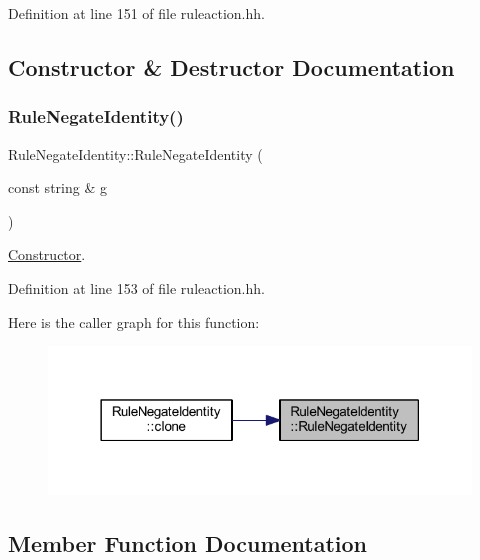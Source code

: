 Definition at line 151 of file ruleaction.\+hh.



\subsection{Constructor \& Destructor Documentation}
\mbox{\label{class_rule_negate_identity_a7c81a211d10e7c153f438dcff9f5b8f8}} 
\subsubsection{\texorpdfstring{RuleNegateIdentity()}{RuleNegateIdentity()}}
{\footnotesize\ttfamily Rule\+Negate\+Identity\+::\+Rule\+Negate\+Identity (\begin{DoxyParamCaption}\item[{const string \&}]{g }\end{DoxyParamCaption})\hspace{0.3cm}{\ttfamily [inline]}}



\mbox{\hyperlink{class_constructor}{Constructor}}. 



Definition at line 153 of file ruleaction.\+hh.

Here is the caller graph for this function\+:
\nopagebreak
\begin{figure}[H]
\begin{center}
\leavevmode
\includegraphics[width=318pt]{class_rule_negate_identity_a7c81a211d10e7c153f438dcff9f5b8f8_icgraph}
\end{center}
\end{figure}


\subsection{Member Function Documentation}
\mbox{\label{class_rule_negate_identity_a9de23484c0f96f82044def3765270523}} 
